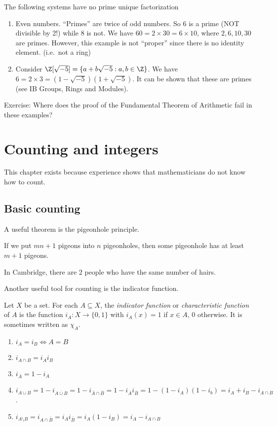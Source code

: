 \documentclass[a4paper]{article}
\begin{document}
\begin{eg}
  The following systems have no prime unique factorization
  \begin{enumerate}
    \item Even numbers. ``Primes'' are twice of odd numbers. So 6 is a prime (NOT divisible by 2!) while 8 is not. We have $60 = 2\times 30 = 6\times 10$, where $2, 6, 10, 30$ are primes. However, this example is not ``proper'' since there is no identity element. (i.e.\ not a ring)
    \item Consider $\Z[\sqrt{-5}] = \{a + b\sqrt{-5} : a, b\in \Z\}$. We have $6 = 2\times 3 = (1 - \sqrt{-5})(1 + \sqrt{-5})$. It can be shown that these are primes (see IB Groups, Rings and Modules).
  \end{enumerate}
\end{eg}
Exercise: Where does the proof of the Fundamental Theorem of Arithmetic fail in these examples?

\section{Counting and integers}
This chapter exists because experience shows that mathematicians do not know how to count.

\subsection{Basic counting}
A useful theorem is the pigeonhole principle.
\begin{thm}
  If we put $mn + 1$ pigeons into $n$ pigeonholes, then some pigeonhole has at least $m + 1$ pigeons.
\end{thm}

\begin{eg}
  In Cambridge, there are 2 people who have the same number of hairs.
\end{eg}

Another useful tool for counting is the indicator function.
\begin{defi}
  Let $X$ be a set. For each $A\subseteq X$, the \emph{indicator function} or \emph{characteristic function} of $A$ is the function $i_A: X\to \{0, 1\}$ with $i_A(x) = 1$ if $x\in A$, $0$ otherwise. It is sometimes written as $\chi_A$.
\end{defi}
\begin{prop}\leavevmode
  \begin{enumerate}
    \item $i_A = i_B \Leftrightarrow A = B$
    \item $i_{A\cap B} = i_A i_B$
    \item $i_{\bar{A}} = 1 - i_A$
    \item $i_{A\cup B} = 1 - i_{\overline{A\cup B}} = 1 - i_{\bar A\cap \bar B} = 1 - i_{\bar{A}}i_{\bar{B}} = 1 - (1 - i_A)(1 - i_b) = i_A + i_B - i_{A\cap B}$.
    \item $i_{A\setminus B} = i_{A\cap \bar B} = i_Ai_{\bar B} = i_A(1 - i_B) = i_A - i_{A\cap B}$
  \end{enumerate}
\end{prop}
\end{document}
